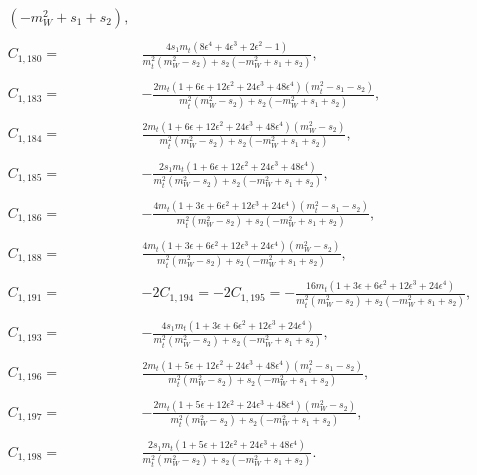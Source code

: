 \documentclass[twocolumn,aps,showpacs,nofootinbib,superscriptaddress,prd]{revtex4-2}
\begin{document}
\begin{widetext}
\begin{align}
{\left(-m_W^2+s_1+s_2\right)}
,\nonumber\\
\nonumber\\
C_{1,180}=&\frac{4s_1m_t\left(8\epsilon^4+4\epsilon^3+2\epsilon^2-1\right)}{m_t^2\left(m_W^2-s_2\right)+s_2
\left(-m_W^2+s_1+s_2\right)}
,\nonumber\\
\nonumber\\
C_{1,183}=&-\frac{2m_t\left(1 +6 \epsilon +12 \epsilon^2 +24 \epsilon^3 +48 \epsilon^4\right)\left(m_t^2-s_1-s_2\right)}{m_t^2
\left(m_W^2-s_2\right)+s_2\left(-m_W^2+s_1+s_2\right)}
,\nonumber\\
\nonumber\\
C_{1,184}=&\frac{2m_t\left(1 +6 \epsilon +12 \epsilon^2 +24 \epsilon^3 +48 \epsilon^4\right)\left(m_W^2-s_2\right)}{m_t^2
\left(m_W^2-s_2\right)+s_2\left(-m_W^2+s_1+s_2\right)}
,\nonumber\\
\nonumber\\
C_{1,185}=&-\frac{2s_1m_t\left(1 +6 \epsilon +12 \epsilon^2 +24 \epsilon^3 +48 \epsilon^4\right)}{m_t^2\left(m_W^2-s_2\right)+s_2
\left(-m_W^2+s_1+s_2\right)}
,\nonumber\\
\nonumber\\
C_{1,186}=&-\frac{4m_t\left(1 +3 \epsilon +6 \epsilon^2 +12 \epsilon^3 +24 \epsilon^4\right)\left(m_t^2-s_1-s_2\right)}{m_t^2
\left(m_W^2-s_2\right)+s_2\left(-m_W^2+s_1+s_2\right)}
,\nonumber\\
\nonumber\\
C_{1,188}=&\frac{4m_t\left(1 +3 \epsilon +6 \epsilon^2 +12 \epsilon^3 +24 \epsilon^4\right)\left(m_W^2-s_2\right)}{m_t^2
\left(m_W^2-s_2\right)+s_2\left(-m_W^2+s_1+s_2\right)}
,\nonumber\\
\nonumber\\
C_{1,191}=&-2C_{1,194}=-2C_{1,195}=-\frac{16m_t\left(1 +3 \epsilon +6 \epsilon^2 +12 \epsilon^3 +24 \epsilon^4\right)}{m_t^2\left(m_W^2-s_2\right)+s_2
\left(-m_W^2+s_1+s_2\right)}
,\nonumber\\
\nonumber\\
C_{1,193}=&-\frac{4s_1m_t\left(1 +3 \epsilon +6 \epsilon^2 +12 \epsilon^3 +24 \epsilon^4\right)}{m_t^2\left(m_W^2-s_2\right)+s_2
\left(-m_W^2+s_1+s_2\right)}
,\nonumber\\
\nonumber\\
C_{1,196}=&\frac{2m_t\left(1 +5 \epsilon +12 \epsilon^2 +24 \epsilon^3 +48 \epsilon^4\right)\left(m_t^2-s_1-s_2\right)}{m_t^2
\left(m_W^2-s_2\right)+s_2\left(-m_W^2+s_1+s_2\right)}
,\nonumber\\
\nonumber\\
C_{1,197}=&-\frac{2m_t\left(1 +5 \epsilon +12 \epsilon^2 +24 \epsilon^3 +48 \epsilon^4\right)\left(m_W^2-s_2\right)}{m_t^2
\left(m_W^2-s_2\right)+s_2\left(-m_W^2+s_1+s_2\right)}
,\nonumber\\
\nonumber\\
C_{1,198}=&\frac{2s_1m_t\left(1 +5 \epsilon +12 \epsilon^2 +24 \epsilon^3 +48 \epsilon^4\right)}{m_t^2\left(m_W^2-s_2\right)+s_2
\left(-m_W^2+s_1+s_2\right)}.
\end{align}
\end{widetext}
\end{document}
